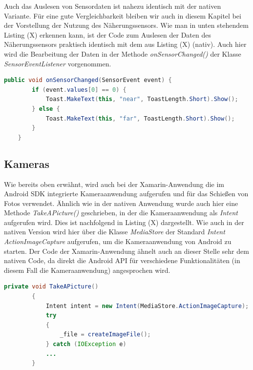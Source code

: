Auch das Auslesen von Sensordaten ist nahezu identisch mit der nativen Variante. Für eine gute Vergleichbarkeit bleiben wir auch in diesem Kapitel bei der Vorstellung der Nutzung des Näherungssensors. Wie man in unten stehendem Listing (X) erkennen kann, ist der Code zum Auslesen der Daten des Näherungssensors praktisch identisch mit dem aus Listing (X) (nativ). Auch hier wird die Bearbeitung der Daten in der Methode \textit{onSensorChanged()} der Klasse \textit{SensorEventListener} vorgenommen.

\begin{lstlisting}[caption=Auslesen der Daten des Näherungssensors (Xamarin), label=lst:ProximityXamarin, language=Java]
public void onSensorChanged(SensorEvent event) {
        if (event.values[0] == 0) {
            Toast.MakeText(this, "near", ToastLength.Short).Show();
        } else {
            Toast.MakeText(this, "far", ToastLength.Short).Show();
        }
    }
\end{lstlisting}

\subsection{Kameras}

Wie bereits oben erwähnt, wird auch bei der Xamarin-Anwendung die im Android SDK integrierte Kameraanwendung aufgerufen und für das Schießen von Fotos verwendet. Ähnlich wie in der nativen Anwendung wurde auch hier eine Methode \textit{TakeAPicture()} geschrieben, in der die Kameraanwendung als \textit{Intent} aufgerufen wird. Dies ist nachfolgend in Listing (X) dargestellt. Wie auch in der nativen Version wird hier über die Klasse \textit{MediaStore} der Standard \textit{Intent ActionImageCapture} aufgerufen, um die Kameraanwendung von Android zu starten. Der Code der Xamarin-Anwendung ähnelt auch an dieser Stelle sehr dem nativen Code, da direkt die Android API für verschiedene Funktionalitäten (in diesem Fall die Kameraanwendung) angesprochen wird.
\clearpage 

\begin{lstlisting}[caption=Methode \textit{TakeAPicture()}: Aufruf der Android-Kamerafunktion über einen \textit{Intent} in Xamarin, label=lst:IntentCameraXamarin, language=Java]
private void TakeAPicture()
        {
            Intent intent = new Intent(MediaStore.ActionImageCapture);
            try
            {
                _file = createImageFile();
            } catch (IOException e)
            ...
        }
\end{lstlisting}

